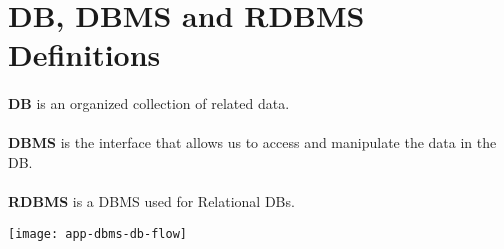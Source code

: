 
\section{\acl{DB}, \acs{DBMS} and \acs{RDBMS} Definitions}
\label{sec:db}
\paragraph{} \textbf{\acl{DB}} is an organized collection of related data.
\label{sec:dbms}
\paragraph{} \textbf{\acf{DBMS}} is the interface that allows us to access and manipulate the data in the \acl{DB}.
\label{sec:rdbms}
\paragraph{} \textbf{\acf{RDBMS}} is a \acs{DBMS} used for Relational \aclp{DB}.
\begin{center}
	\texttt{[image: app-dbms-db-flow]}
\end{center}
